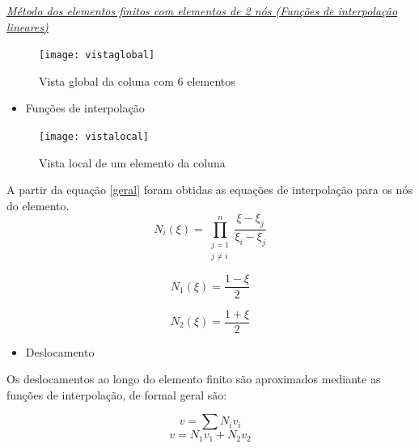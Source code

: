 \documentclass{article} %
\begin{document}
\vspace{10mm}

\underline{\large \textit{Método dos elementos finitos com elementos de 2 nós (Funções de interpolação lineares)}}\\


\begin{figure}[H]
	\centering
	\caption{Vista global da coluna com 6 elementos}
	\texttt{[image: vistaglobal]}	
	\label{patton}	
\end{figure}





\begin{itemize}
	\item Funções de interpolação	
\end{itemize}

\begin{figure}[H]
	\centering
	\caption{Vista local de um elemento da coluna}
	\texttt{[image: vistalocal]}	
	\label{patton}	
\end{figure}

A partir da equação \ref{geral} foram obtidas as equações de interpolação para os nós do elemento.
\begin{equation}\label{geral}
N_i(\xi)=\prod_{\begin{matrix}
	j=1\\ 
	j\neq i
	\end{matrix}}^n\frac{\xi-\xi_j}{\xi_i-\xi_j} 
\end{equation}

\begin{equation}
N_1(\xi)=\frac{1-\xi}{2}
\end{equation}




\begin{equation}
N_2(\xi)=\frac{1+\xi}{2}
\end{equation}

\begin{itemize}
	\item Deslocamento
\end{itemize}

\indent Os deslocamentos ao longo do elemento finito são aproximados mediante as funções de interpolação, de formal geral são:

\begin{equation}
v=\sum N_iv_i
\end{equation}
\begin{equation*}
v=N_1v_1+N_2v_2
\end{equation*}
\end{document}
